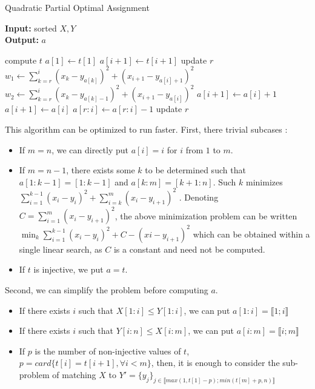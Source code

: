 \documentclass[a4paper,12pt]{article}
\begin{document}
\begin{algorithm}
\caption{Quadratic Partial Optimal Assignment}\label{a_quad}
\hspace*{\algorithmicindent} \textbf{Input:} sorted $X,Y$\\
\hspace*{\algorithmicindent} \textbf{Output:} $a$ 
\begin{algorithmic}[1]
\State compute $t$
\State $a[1] \gets t[1]$
		\State $a[i+1] \gets t[i+1]$
		\State update $r$
    \Else
        \State $w_1 \gets \sum_{k=r}^{i} (x_k - y_{a[k]})^2 + (x_{i+1} - y_{a[i]+1})^2$
        \State $w_2 \gets \sum_{k=r}^{i} (x_k - y_{a[k]-1})^2 + (x_{i+1} - y_{a[i]})^2$
         
        	\State $a[i+1] \gets a[i]+1$
        \Else {}
        	\State $a[i+1] \gets a[i]$
        	\State $a[r:i] \gets a[r:i]-1$
        	\State update $r$
        \EndIf
    \EndIf
\EndFor
\State {}
\end{algorithmic}
\end{algorithm}

This algorithm can be optimized to run faster. First, there trivial subcases :
\begin{itemize}
\item If $m=n$, we can directly put $a[i]=i$ for $i$ from $1$ to $m$.

\item If $m=n-1$, there exists some $k$ to be determined such that $a[1: k − 1] = [1: k − 1]$
and $a[k: m] = [k + 1: n]$. Such $k$ minimizes $\sum_{i=1}^{k-1} (x_i-y_i)^2 + \sum_{i=k}^{m} (x_i-y_{i+1})^2 $ . Denoting $C = \sum_{i=1}^m (x_i - y_{i+1})^2$, the above minimization problem can be written $\min_k \sum_{i=1}^{k-1} (x_i-y_i)^2 + C - (x i - y_{i+1})^2$ which can be obtained within a single linear search, as $C$ is a constant and need not be computed.

\item If $t$ is injective, we put $a=t$.
\end{itemize}

Second, we can simplify the problem before computing $a$.
\begin{itemize}
\item If there exists $i$ such that $X[1:i] \leqslant Y[1:i]$, we can put $a[1:i] = \llbracket 1;i \rrbracket$
\item If there exists $i$ such that $Y[i:n] \leqslant X[i:m]$, we can put $a[i:m] = \llbracket i;m \rrbracket$
\item If $p$ is the number of non-injective values of $t$, $p=card\{t[i] = t[i + 1], \forall i < m\}$, then, it is enough to consider the sub-problem of matching $X$ to $Y' = \{y_j\}_{j \in \llbracket max(1,t[1]−p) ; min(t[m]+p,n) \rrbracket}$
\end{itemize}
\end{document}

